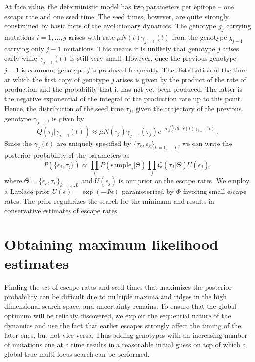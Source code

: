 \documentclass{frontiers}
\newcommand{\gt}{g}
\newcommand{\gtfreq}{\gamma}
\newcommand{\fcoeff}{\epsilon}
\newcommand{\fitprior}{\Phi}
\begin{document}
At face value, the deterministic model has two parameters per epitope --
one escape rate and one seed time. The
seed times, however, are quite strongly constrained by basic facts of the
evolutionary dynamics. The genotype $\gt_j$ carrying mutations
$i=1,\ldots,j$ arises with
rate $\mu N(t)\gtfreq_{j-1}(t)$ from the genotype $\gt_{j-1}$ carrying only $j-1$ mutations.
This means it is unlikely that genotype $j$ arises early while $\gtfreq_{j-1}(t)$ is still
very small. However, once the previous genotype $j-1$ is common, genotype $j$ 
is produced frequently. The distribution of the time at which the first copy 
of genotype $j$ arises is given by the product of the rate of production and the 
probability that it has not yet been produced. The latter is the negative exponential 
of the integral of the production rate up to this point. Hence, the distribution of the 
seed time $\tau_j$, given the trajectory of the previous genotype $\gtfreq_{j-1}$,
is given by
\begin{equation}
\label{eq:seedtimes}
Q(\tau_j | \gtfreq_{j-1}(t)) \approx \mu N(\tau_j)\gtfreq_{j-1}(\tau_j) e^{-\mu
\int_0^{\tau_j}dt\; N(t)\gtfreq_{j-1}(t)} \ .
\end{equation}
Since the $\gtfreq_j(t)$ are uniquely specified by $\{\tau_k,\fcoeff_k\}_{k=1,\ldots,L}$, we can
write the posterior probability of the parameters as 
\begin{equation}
\label{eq:LH}
P(\{\fcoeff_j,\tau_j\})  \propto \prod_{i} P(\mathrm{sample}_i|\Theta)\prod_j
Q(\tau_j|\Theta)U(\fcoeff_j),
\end{equation}
where $\Theta = \{ \fcoeff_k,\tau_k\}_{k=1\ldots L}$ and $U(\fcoeff_j)$
is our prior on the escape rates. 
We employ a Laplace prior $U(\fcoeff) = \exp(-\fitprior\fcoeff)$  parameterized by $\fitprior$ 
favoring small escape rates. The prior regularizes the search for the minimum and results in
conservative estimates of escape rates.


\section{Obtaining maximum likelihood estimates} 
Finding the set of escape rates and seed times that maximizes the posterior probability
can be difficult due to multiple maxima and ridges in the high
dimensional search space, and uncertainty remains.
To ensure that the global optimum will be reliably discovered, we exploit the
sequential nature of the dynamics and use the fact that earlier escapes
strongly affect the timing of the later ones, but not vice versa. Thus adding
genotypes with an increasing number of mutations one at a time 
results in a reasonable initial guess on top of which a global true multi-locus search can be
performed.
\end{document}

